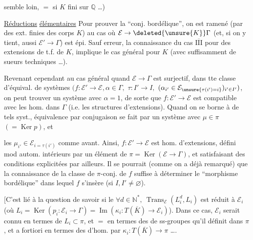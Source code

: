 

semble loin, $=$ si $K$ fini sur $\mathbb Q$ \ldots)

\uline{Réductions} \uline{élémentaires} Pour prouver la ``conj. bordélique'', on est ramené (par des ext. finies des corps $K$) au cas où $\mathcal E\to\deleted{\unsure{K}}\Gamma$ (et, si on y tient, aussi $\mathcal E'\to\Gamma$) est épi. Sauf erreur, la connaissance du cas \uline{$\overline{\mathrm{III}}$} pour des extensions de t.f. de $K$, implique le cas général pour $K$ (avec suffisamment de sueurs techniques \ldots).

Revenant cependant au cas général quand $\mathcal E\to\Gamma$ est surjectif, dans tte classe d'équival. de systèmes $(f:\mathcal E'\to\mathcal E,\alpha\in\Gamma,$  $\tau:I'\to I,$  $(\alpha_{i'}\in\mathcal E_{\unsure{\tau(i')=i}})_{i'\in I'})$, on peut trouver un système avec $\alpha=1$, de sorte que $f:\mathcal E'\to\mathcal E$ est compatible avec les hom. dans $\Gamma$ (i.e. les structures d'extensions).
Quand on se borne à de tels syst.,  équivalence par conjugaison se fait par un système  avec \uline{$\mu\in\pi$} $(=\operatorname{Ker}p)$, et



les $\mu_{i'}\in\mathcal E_{i=\tau(i')}$ comme avant. Ainsi, $f:\mathcal E'\to\mathcal E$ est   hom. d'extensions, défini mod autom. intérieurs par un élément de $\pi=\operatorname{Ker}(\mathcal E\to\Gamma)$, et satisfaisant des conditions explicitées par ailleurs.
Il se pourrait (comme on a déjà remarqué) que la connaissance de la  classe de $\pi$-conj. de $f$ suffise à déterminer le ``morphisme bordélique'' dans lequel $f$ s'insère (si $I,I'\ne\varnothing$).

[C'est lié à la question de savoir si le   $\forall d\in\mathbb N^*,\ \operatorname{Trans}_{\mathcal E}(L_i^d,L_i)$ est réduit à $\mathcal E_i$ (où $L_i=\operatorname{Ker}(p_i:\mathcal E_i\to\Gamma)=\operatorname{Im}(\kappa_i:T(\overline K)\to\mathcal E_i)$).
Dans ce cas, $\mathcal E_i$ serait connu en termes de $L_i\subset\pi$, et $=$ en termes des  de ss-groupes qu'il définit dans $\pi$, et a fortiori en termes des  d'hom.  par $\kappa_i:T(\overline K)\to\pi$ \ldots.

